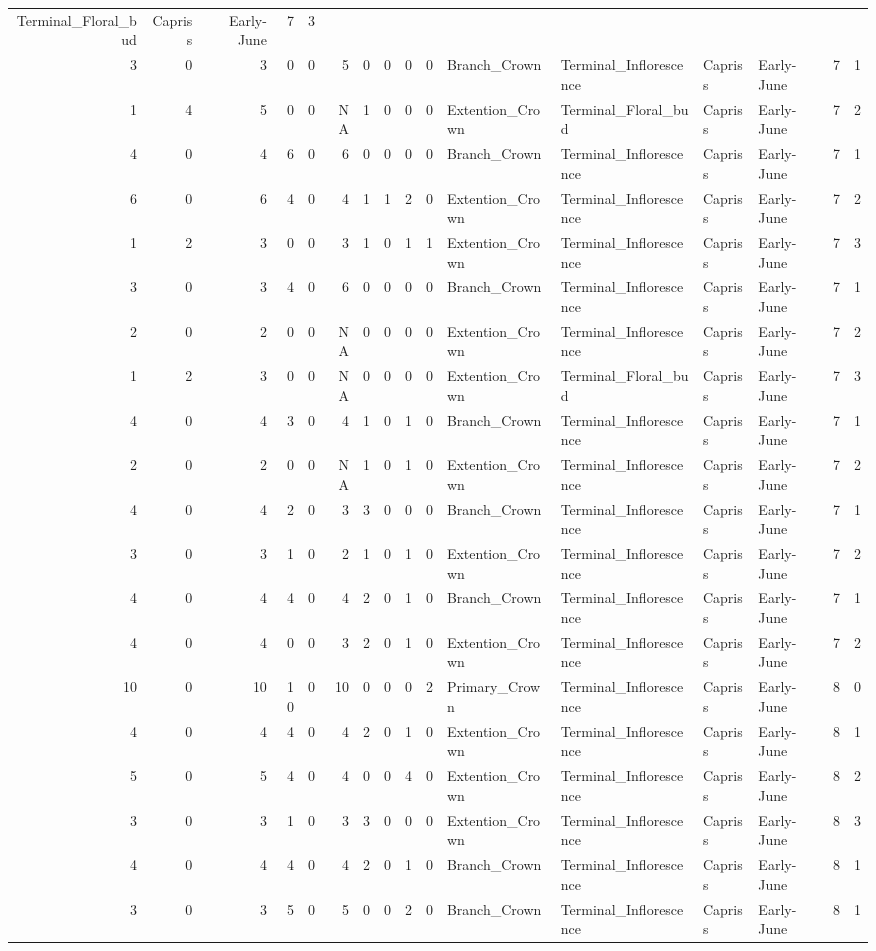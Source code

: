 \documentclass[]{article}
\begin{document}
\begin{longtable}[]{@{}rrrrrrrrrrllllrl@{}}
Terminal\_Floral\_bud & Capriss & Early-June & 7 & 3\tabularnewline
3 & 0 & 3 & 0 & 0 & 5 & 0 & 0 & 0 & 0 & Branch\_Crown &
Terminal\_Inflorescence & Capriss & Early-June & 7 & 1\tabularnewline
1 & 4 & 5 & 0 & 0 & NA & 1 & 0 & 0 & 0 & Extention\_Crown &
Terminal\_Floral\_bud & Capriss & Early-June & 7 & 2\tabularnewline
4 & 0 & 4 & 6 & 0 & 6 & 0 & 0 & 0 & 0 & Branch\_Crown &
Terminal\_Inflorescence & Capriss & Early-June & 7 & 1\tabularnewline
6 & 0 & 6 & 4 & 0 & 4 & 1 & 1 & 2 & 0 & Extention\_Crown &
Terminal\_Inflorescence & Capriss & Early-June & 7 & 2\tabularnewline
1 & 2 & 3 & 0 & 0 & 3 & 1 & 0 & 1 & 1 & Extention\_Crown &
Terminal\_Inflorescence & Capriss & Early-June & 7 & 3\tabularnewline
3 & 0 & 3 & 4 & 0 & 6 & 0 & 0 & 0 & 0 & Branch\_Crown &
Terminal\_Inflorescence & Capriss & Early-June & 7 & 1\tabularnewline
2 & 0 & 2 & 0 & 0 & NA & 0 & 0 & 0 & 0 & Extention\_Crown &
Terminal\_Inflorescence & Capriss & Early-June & 7 & 2\tabularnewline
1 & 2 & 3 & 0 & 0 & NA & 0 & 0 & 0 & 0 & Extention\_Crown &
Terminal\_Floral\_bud & Capriss & Early-June & 7 & 3\tabularnewline
4 & 0 & 4 & 3 & 0 & 4 & 1 & 0 & 1 & 0 & Branch\_Crown &
Terminal\_Inflorescence & Capriss & Early-June & 7 & 1\tabularnewline
2 & 0 & 2 & 0 & 0 & NA & 1 & 0 & 1 & 0 & Extention\_Crown &
Terminal\_Inflorescence & Capriss & Early-June & 7 & 2\tabularnewline
4 & 0 & 4 & 2 & 0 & 3 & 3 & 0 & 0 & 0 & Branch\_Crown &
Terminal\_Inflorescence & Capriss & Early-June & 7 & 1\tabularnewline
3 & 0 & 3 & 1 & 0 & 2 & 1 & 0 & 1 & 0 & Extention\_Crown &
Terminal\_Inflorescence & Capriss & Early-June & 7 & 2\tabularnewline
4 & 0 & 4 & 4 & 0 & 4 & 2 & 0 & 1 & 0 & Branch\_Crown &
Terminal\_Inflorescence & Capriss & Early-June & 7 & 1\tabularnewline
4 & 0 & 4 & 0 & 0 & 3 & 2 & 0 & 1 & 0 & Extention\_Crown &
Terminal\_Inflorescence & Capriss & Early-June & 7 & 2\tabularnewline
10 & 0 & 10 & 10 & 0 & 10 & 0 & 0 & 0 & 2 & Primary\_Crown &
Terminal\_Inflorescence & Capriss & Early-June & 8 & 0\tabularnewline
4 & 0 & 4 & 4 & 0 & 4 & 2 & 0 & 1 & 0 & Extention\_Crown &
Terminal\_Inflorescence & Capriss & Early-June & 8 & 1\tabularnewline
5 & 0 & 5 & 4 & 0 & 4 & 0 & 0 & 4 & 0 & Extention\_Crown &
Terminal\_Inflorescence & Capriss & Early-June & 8 & 2\tabularnewline
3 & 0 & 3 & 1 & 0 & 3 & 3 & 0 & 0 & 0 & Extention\_Crown &
Terminal\_Inflorescence & Capriss & Early-June & 8 & 3\tabularnewline
4 & 0 & 4 & 4 & 0 & 4 & 2 & 0 & 1 & 0 & Branch\_Crown &
Terminal\_Inflorescence & Capriss & Early-June & 8 & 1\tabularnewline
3 & 0 & 3 & 5 & 0 & 5 & 0 & 0 & 2 & 0 & Branch\_Crown &
Terminal\_Inflorescence & Capriss & Early-June & 8 & 1\tabularnewline

\end{longtable}
\end{document}

